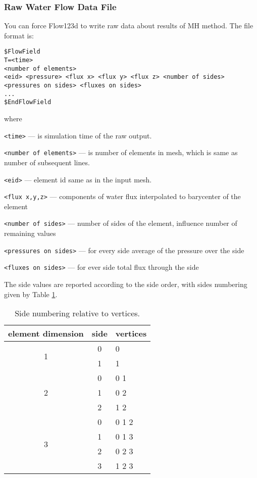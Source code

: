 \subsubsection{Raw Water Flow Data File}
You can force Flow123d to write raw data about results of MH method. The file format is:
\begin{verbatim}
$FlowField
T=<time>
<number of elements>
<eid> <pressure> <flux x> <flux y> <flux z> <number of sides> <pressures on sides> <fluxes on sides> 
...
$EndFlowField
\end{verbatim}

where 
\begin{description}
 \item \verb'<time>' --- is simulation time of the raw output.
 \item \verb'<number of elements>' --- is number of elements in mesh, which is same as number of subsequent lines.
 \item \verb'<eid>' --- element id same as in the input mesh.
 \item \verb'<flux x,y,z>' --- components of water flux interpolated to barycenter of the element
 \item \verb'<number of sides>' --- number of sides of the element, influence number of remaining values
 \item \verb'<pressures on sides>' --- for every side average of the pressure over the side
 \item \verb'<fluxes on sides>' --- for ever side total flux through the side 
\end{description}

The side values are reported according to the side order, with sides numbering given by Table \ref{tab:side-numbers}.
\begin{table}[!h]
    \centering
    \caption{Side numbering relative to vertices.}
    \label{tab:side-numbers}
    \begin{tabular}{ccl}
        \toprule
        element dimension   &   side       &   vertices \\
        \toprule
        \multirow{2}{*}{1}  &   0          &   0  \\
                            &   1          &   1  \\
        \midrule
        \multirow{3}{*}{2}  &   0          &   0 1  \\
                            &   1          &   0 2  \\
                            &   2          &   1 2  \\    
        \midrule
        \multirow{4}{*}{3}  &   0          &   0 1 2 \\
                            &   1          &   0 1 3 \\
                            &   2          &   0 2 3 \\
                            &   3          &   1 2 3 \\    
        \bottomrule
    \end{tabular}    
\end{table}

